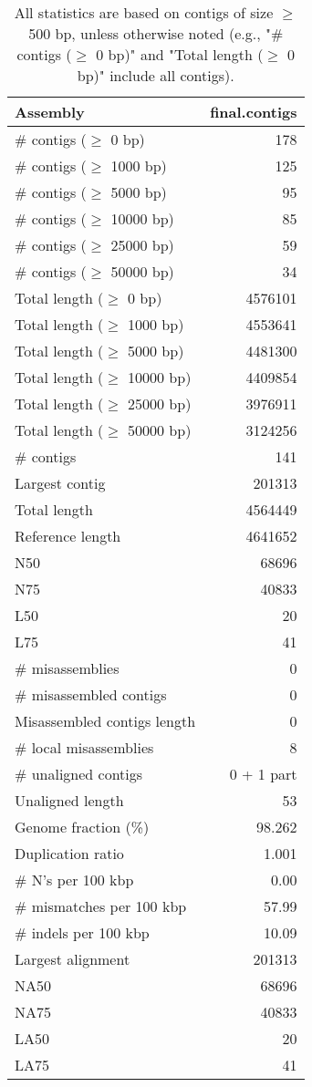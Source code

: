 \documentclass[12pt,a4paper]{article}
\begin{document}
\begin{table}[ht]
\begin{center}
\caption{All statistics are based on contigs of size $\geq$ 500 bp, unless otherwise noted (e.g., "\# contigs ($\geq$ 0 bp)" and "Total length ($\geq$ 0 bp)" include all contigs).}
\begin{tabular}{|l*{1}{|r}|}
\hline
Assembly & final.contigs \\ \hline
\# contigs ($\geq$ 0 bp) & 178 \\ \hline
\# contigs ($\geq$ 1000 bp) & 125 \\ \hline
\# contigs ($\geq$ 5000 bp) & 95 \\ \hline
\# contigs ($\geq$ 10000 bp) & 85 \\ \hline
\# contigs ($\geq$ 25000 bp) & 59 \\ \hline
\# contigs ($\geq$ 50000 bp) & 34 \\ \hline
Total length ($\geq$ 0 bp) & 4576101 \\ \hline
Total length ($\geq$ 1000 bp) & 4553641 \\ \hline
Total length ($\geq$ 5000 bp) & 4481300 \\ \hline
Total length ($\geq$ 10000 bp) & 4409854 \\ \hline
Total length ($\geq$ 25000 bp) & 3976911 \\ \hline
Total length ($\geq$ 50000 bp) & 3124256 \\ \hline
\# contigs & 141 \\ \hline
Largest contig & 201313 \\ \hline
Total length & 4564449 \\ \hline
Reference length & 4641652 \\ \hline
N50 & 68696 \\ \hline
N75 & 40833 \\ \hline
L50 & 20 \\ \hline
L75 & 41 \\ \hline
\# misassemblies & 0 \\ \hline
\# misassembled contigs & 0 \\ \hline
Misassembled contigs length & 0 \\ \hline
\# local misassemblies & 8 \\ \hline
\# unaligned contigs & 0 + 1 part \\ \hline
Unaligned length & 53 \\ \hline
Genome fraction (\%) & 98.262 \\ \hline
Duplication ratio & 1.001 \\ \hline
\# N's per 100 kbp & 0.00 \\ \hline
\# mismatches per 100 kbp & 57.99 \\ \hline
\# indels per 100 kbp & 10.09 \\ \hline
Largest alignment & 201313 \\ \hline
NA50 & 68696 \\ \hline
NA75 & 40833 \\ \hline
LA50 & 20 \\ \hline
LA75 & 41 \\ \hline
\end{tabular}
\end{center}
\end{table}
\end{document}
